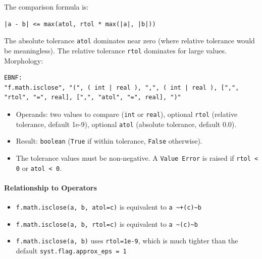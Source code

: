 The comparison formula is:
\begin{verbatim}
|a - b| <= max(atol, rtol * max(|a|, |b|))
\end{verbatim}
The absolute tolerance \texttt{atol} dominates near zero (where relative tolerance would be meaningless). The relative tolerance \texttt{rtol} dominates for large values.\\
Morphology:
\begin{verbatim}
EBNF:
"f.math.isclose", "(", ( int | real ), ",", ( int | real ), [",", "rtol", "=", real], [",", "atol", "=", real], ")"
\end{verbatim}
\begin{itemize}
\item Operands: two values to compare (\texttt{int} or \texttt{real}), optional \texttt{rtol} (relative tolerance, default 1e-9), optional \texttt{atol} (absolute tolerance, default 0.0).
\item Result: \texttt{boolean} (\texttt{True} if within tolerance, \texttt{False} otherwise).
\item The tolerance values must be non-negative. A \texttt{Value Error} is raised if \texttt{rtol < 0} or \texttt{atol < 0}.
\end{itemize}

\paragraph{Relationship to Operators}
\begin{itemize}
\item \texttt{f.math.isclose(a, b, atol=c)} is equivalent to \texttt{a \textasciitilde+(c)\textasciitilde b}
\item \texttt{f.math.isclose(a, b, rtol=c)} is equivalent to \texttt{a \textasciitilde*(c)\textasciitilde b}
\item \texttt{f.math.isclose(a, b)} uses \texttt{rtol=1e-9}, which is much tighter than the default \texttt{syst.flag.approx\_eps = 1}
\end{itemize}

